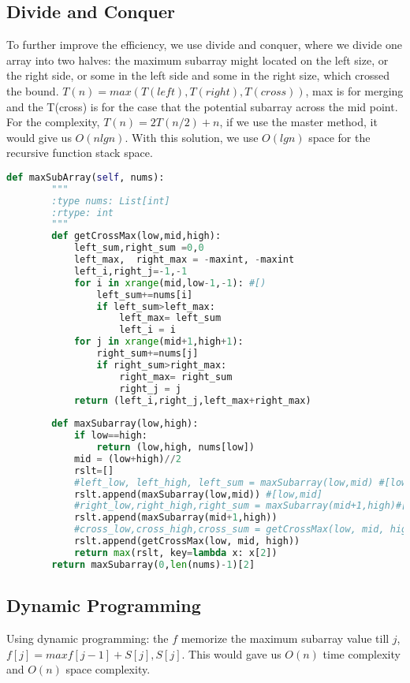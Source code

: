 \documentclass[../algorithms.tex]{subfiles}
\begin{document}
\subsection{Divide and Conquer}
To further improve the efficiency, we use divide and conquer, where we divide one array into two halves: the maximum subarray might located on the left size, or the right side, or some in the left side and some in the right size, which crossed the bound. $T(n) = max(T(left),T(right), T(cross))$, max is for merging and the T(cross) is for the case that the potential subarray across the mid point. For the complexity, $T(n)=2T(n/2)+n$, if we use the master method, it would give us $O(nlgn)$. With this solution, we use $O(lgn)$ space for the recursive function stack space.
\begin{lstlisting}[language=Python]
def maxSubArray(self, nums):
        """
        :type nums: List[int]
        :rtype: int
        """
        def getCrossMax(low,mid,high):
            left_sum,right_sum =0,0
            left_max,  right_max = -maxint, -maxint
            left_i,right_j=-1,-1
            for i in xrange(mid,low-1,-1): #[)
                left_sum+=nums[i]
                if left_sum>left_max:
                    left_max= left_sum
                    left_i = i
            for j in xrange(mid+1,high+1):
                right_sum+=nums[j]
                if right_sum>right_max:
                    right_max= right_sum
                    right_j = j
            return (left_i,right_j,left_max+right_max)
        
        def maxSubarray(low,high):
            if low==high:
                return (low,high, nums[low])
            mid = (low+high)//2
            rslt=[]
            #left_low, left_high, left_sum = maxSubarray(low,mid) #[low,mid]
            rslt.append(maxSubarray(low,mid)) #[low,mid]
            #right_low,right_high,right_sum = maxSubarray(mid+1,high)#[mid+1,high]
            rslt.append(maxSubarray(mid+1,high))
            #cross_low,cross_high,cross_sum = getCrossMax(low, mid, high)
            rslt.append(getCrossMax(low, mid, high))
            return max(rslt, key=lambda x: x[2])
        return maxSubarray(0,len(nums)-1)[2]
\end{lstlisting}
\subsection{Dynamic Programming}
Using dynamic programming: the $f$ memorize the maximum subarray value till $j$, $f[ j ] = max f [ j- 1] + S [ j ] , S [ j ]$. This would gave us $O(n)$ time complexity and $O(n)$ space complexity.
\end{document}
